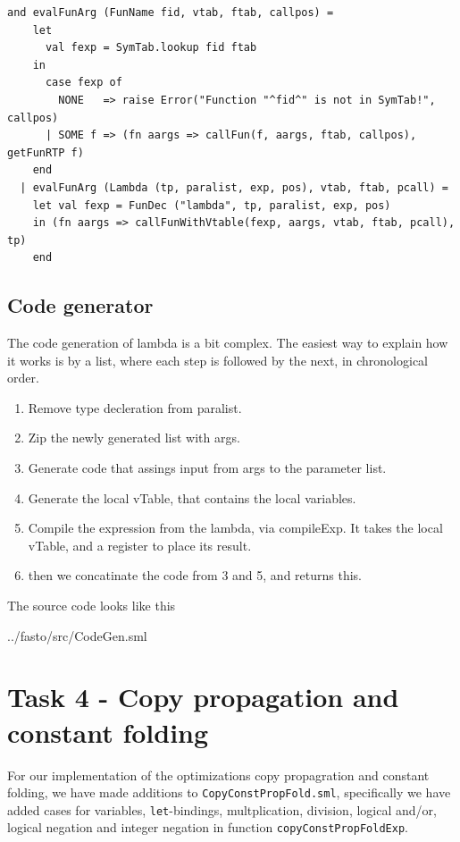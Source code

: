 \documentclass[11pt]{article}
\begin{document}
    \begin{lstlisting}[basicstyle=\small]
and evalFunArg (FunName fid, vtab, ftab, callpos) =
    let
      val fexp = SymTab.lookup fid ftab
    in
      case fexp of
        NONE   => raise Error("Function "^fid^" is not in SymTab!", callpos)
      | SOME f => (fn aargs => callFun(f, aargs, ftab, callpos), getFunRTP f)
    end
  | evalFunArg (Lambda (tp, paralist, exp, pos), vtab, ftab, pcall) =
    let val fexp = FunDec ("lambda", tp, paralist, exp, pos)
    in (fn aargs => callFunWithVtable(fexp, aargs, vtab, ftab, pcall), tp)
    end
    \end{lstlisting}

\subsection{Code generator}
The code generation of lambda is a bit complex. The easiest way to explain how it works
is by a list, where each step is followed by the next, in chronological order.
\begin{enumerate}
  \item Remove type decleration from paralist.
  \item Zip the newly generated list with args.
  \item Generate code that assings input from args to the parameter list.
  \item Generate the local vTable, that contains the local variables.
  \item Compile the expression from the lambda, via compileExp. It takes the local vTable,
  and a register to place its result.
  \item then we concatinate the code from 3 and 5, and returns this.
\end{enumerate}
The source code looks like this

{../fasto/src/CodeGen.sml}



    \section{Task 4 - Copy propagation and constant folding}
	For our implementation of the optimizations copy propagration and constant
	folding, we have made additions to \texttt{CopyConstPropFold.sml}, specifically
	we have added cases for variables, \texttt{let}-bindings, multplication,
	division, logical and/or, logical negation and integer negation in function
	\texttt{copyConstPropFoldExp}.
\end{document}
